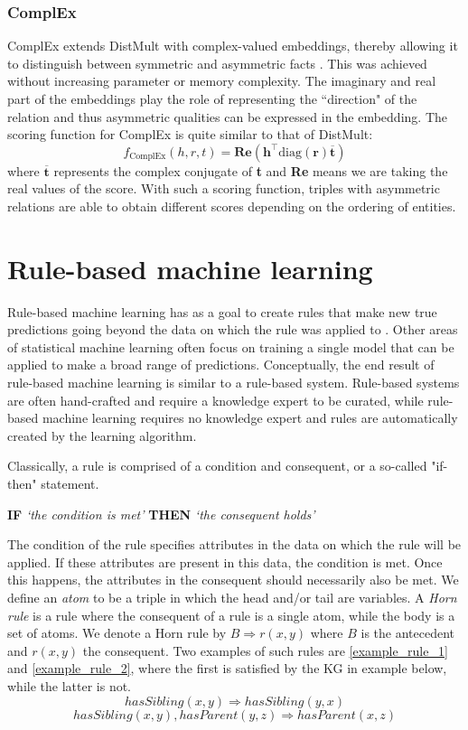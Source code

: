 \subsubsection{ComplEx}
ComplEx extends DistMult with complex-valued embeddings, thereby allowing it to distinguish between symmetric and asymmetric facts \cite{complEx}. This was achieved without increasing parameter or memory complexity. The imaginary and real part of the embeddings play the role of representing the ``direction" of the relation and thus asymmetric qualities can be expressed in the embedding. The scoring function for ComplEx is quite similar to that of DistMult:
\[f_ {\text{ComplEx}}(h, r, t) =\textbf{Re}(\textbf{h}^{\top}\text{diag}(\textbf{r})\overline{\textbf{t}})\]
where $\overline{\textbf{t}}$ represents the complex conjugate of \textbf{t} and \textbf{Re} means we are taking the real values of the score. With such a scoring function, triples with asymmetric relations are able to obtain different scores depending on the ordering of entities.
    

\section{Rule-based machine learning}
Rule-based machine learning has as a goal to create rules that make new true predictions going beyond the data on which the rule was applied to \cite{weiss1995rule}. Other areas of statistical machine learning often focus on training a single model that can be applied to make a broad range of predictions. Conceptually, the end result of rule-based machine learning is similar to a rule-based system.  Rule-based systems are often hand-crafted and require a knowledge expert to be curated, while rule-based machine learning requires no knowledge expert and rules are automatically created by the learning algorithm.

Classically, a rule is comprised of a condition and consequent, or a so-called "if-then" statement. \begin{center} \textbf{IF} \textit{`the condition is met'} \textbf{THEN} \textit{`the consequent holds'} \end{center}
The condition of the rule specifies attributes in the data on which the rule will be applied. If these attributes are present in this data, the condition is met. Once this happens, the attributes in the consequent should necessarily also be met. We define an \textit{atom} to be a triple in which the head and/or tail are variables. A \textit{Horn rule} is a rule where the consequent of a rule is a single atom, while the body is a set of atoms. We denote a Horn rule by $B \Rightarrow r(x, y)$ where $B$ is the antecedent and $r(x, y)$ the consequent. Two examples of such rules are \ref{example_rule_1} and \ref{example_rule_2}, where the first is satisfied by the KG in example below, while the latter is not.
\begin{equation}
hasSibling(x, y) \Rightarrow hasSibling(y,x)
\label{example_rule_1}
\end{equation}
\begin{equation}
    hasSibling(x, y), hasParent(y,z) \Rightarrow hasParent(x,z)
    \label{example_rule_2}
\end{equation}


